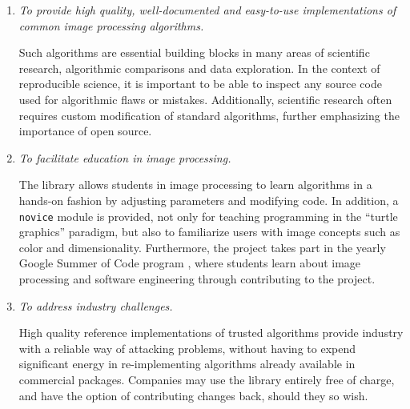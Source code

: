   \begin{enumerate}
    \item  %
      \textit{To provide high quality, well-documented and easy-to-use implementations of common image processing algorithms.}

      Such algorithms are essential building blocks in many areas of scientific research, algorithmic comparisons and data exploration. In the context of reproducible science, it is important to be able to inspect any source code used for algorithmic flaws or mistakes. Additionally, scientific research often requires custom modification of standard algorithms, further emphasizing the importance of open source.

    \item  %
      \textit{To facilitate education in image processing.}

      The library allows students in image processing to learn algorithms in a hands-on fashion by adjusting parameters and modifying code. In addition, a \texttt{novice} module is provided, not only for teaching programming in the ``turtle graphics'' paradigm, but also to familiarize users with image concepts such as color and dimensionality. Furthermore, the project takes part in the yearly Google Summer of Code program \citep{gsoc}, where students learn about image processing and software engineering through contributing to the project.

    \item  %
      \textit{To address industry challenges.}

      High quality reference implementations of trusted algorithms provide industry with a reliable way of attacking problems, without having to expend significant energy in re-implementing algorithms already available in commercial packages.  Companies may use the library entirely free of charge, and have the option of contributing changes back, should they so wish.
  \end{enumerate}